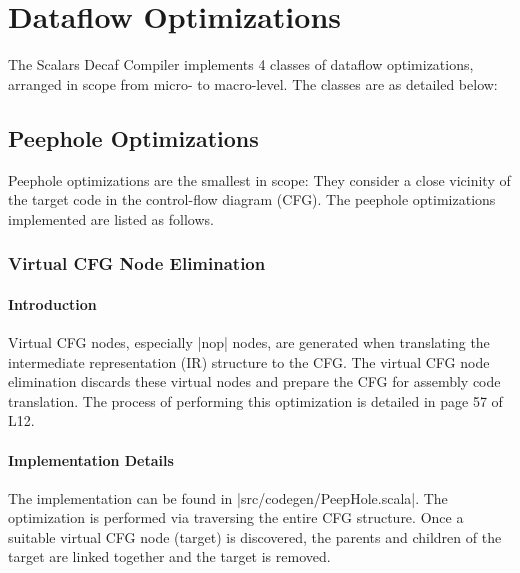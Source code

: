 \tableofcontents

\newpage

\section{Dataflow Optimizations}

The Scalars Decaf Compiler implements 4 classes of dataflow optimizations, arranged in scope from micro- to macro-level. The classes are as detailed below:

\subsection{Peephole Optimizations}

Peephole optimizations are the smallest in scope: They consider a close vicinity of the target code in the control-flow diagram (CFG). The peephole optimizations implemented are listed as follows.

\subsubsection{Virtual CFG Node Elimination}

\paragraph{Introduction}

Virtual CFG nodes, especially |nop| nodes, are generated when translating the intermediate representation (IR) structure to the CFG. The virtual CFG node elimination discards these virtual nodes and prepare the CFG for assembly code translation. The process of performing this optimization is detailed in page 57 of L12.

\paragraph{Implementation Details}

The implementation can be found in |src/codegen/PeepHole.scala|. The optimization is performed via traversing the entire CFG structure. Once a suitable virtual CFG node (target) is discovered, the parents and children of the target are linked together and the target is removed.

